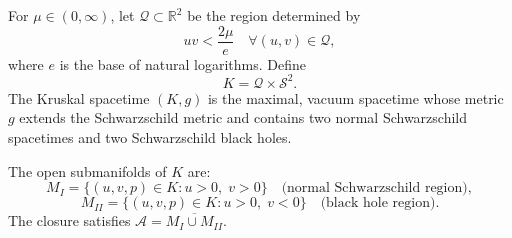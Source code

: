 For $\mu \in (0, \infty)$, let $\mathcal{Q} \subset \mathbb{R}^2$ be the region determined by
$$uv < \frac{2\mu}{e} \quad \forall (u,v) \in \mathcal{Q},$$
where $e$ is the base of natural logarithms. Define
$$K = \mathcal{Q} \times \mathcal{S}^2.$$
The Kruskal spacetime $(K, g)$ is the maximal, vacuum spacetime whose metric $g$ extends the Schwarzschild metric and contains two normal Schwarzschild spacetimes and two Schwarzschild black holes.

The open submanifolds of $K$ are:
$$M_I = \{(u,v,p) \in K : u > 0,\; v > 0\} \quad \text{(normal Schwarzschild region)},$$
$$M_{II} = \{(u,v,p) \in K : u > 0,\; v < 0\} \quad \text{(black hole region)}.$$
The closure satisfies $\mathcal{A} = \overline{M_I \cup M_{II}}$.
